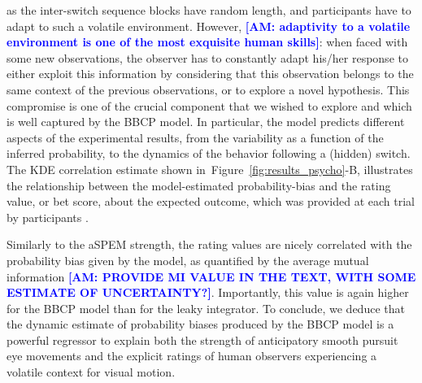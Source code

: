 \documentclass[12pt,english]{article}%
\newcommand{\seeFig}[1]{Figure~\ref{fig:#1}}
\newcommand{\AM}[1]{\textbf{\textcolor{blue}{[AM: #1]}}}
\begin{document}
as the inter-switch sequence blocks have random length,
and participants have to adapt to such a volatile environment.
However, \AM{adaptivity to a volatile environment is one of the most exquisite human skills}: when faced with some new observations,
the observer has to constantly adapt his/her response
to either exploit this information by considering that
this observation belongs to the same context of the previous observations, or to explore
a novel hypothesis.
This compromise is one of the crucial component that we wished to explore
and which is well captured by the BBCP model.
In particular, the model predicts different aspects
of the experimental results,
from the variability as a function of the inferred probability,
to the dynamics of the behavior following a (hidden) switch.
The KDE correlation estimate shown in~\seeFig{results_psycho}-B,
illustrates the relationship between
the model-estimated probability-bias
and the rating value, or bet score, about the expected outcome, which was provided at each trial
by participants .

Similarly to the aSPEM strength, the rating values are nicely correlated
with the probability bias given by the model, as quantified by the average  mutual information \AM{PROVIDE MI VALUE IN THE TEXT, WITH SOME ESTIMATE OF UNCERTAINTY?}.
Importantly, this value is again higher for the BBCP model than 
for the leaky integrator.
To conclude, we deduce that the dynamic estimate of probability biases produced by the BBCP model
is a powerful regressor to explain both the strength of anticipatory smooth pursuit eye movements and the explicit ratings of human observers experiencing a volatile context for visual motion.
\end{document}
